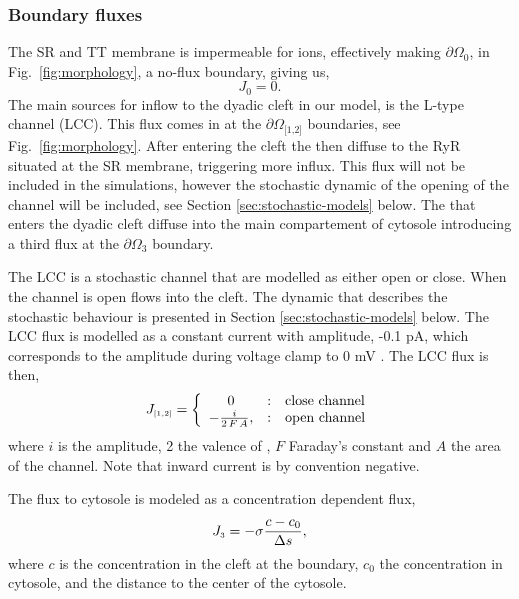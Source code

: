 \subsubsection{Boundary fluxes}
The SR and TT membrane is impermeable for ions, effectively making $\partial\Omega_{\scriptscriptstyle\text{0}}$, in Fig.~\ref{fig:morphology}, a no-flux boundary, giving us,
\begin{equation}
  \label{eq:no-flux}
  J_{\scriptscriptstyle 0}= 0.
\end{equation}
The main sources for \Ca inflow to the dyadic cleft in our model, is the L-type \Ca channel (LCC). This flux comes in at the $\partial\Omega_{\scriptscriptstyle\text{[1,2]}}$ boundaries, see Fig.~\ref{fig:morphology}. After entering the cleft the \Ca then diffuse to the RyR situated at the SR membrane, triggering more \Ca influx. This flux will not be included in the simulations, however the stochastic dynamic of the opening of the channel will be included, see Section \ref{sec:stochastic-models} below. The \Ca that enters the dyadic cleft diffuse into the main compartement of cytosole introducing a third flux at the $\partial\Omega_{\scriptscriptstyle\text{3}}$ boundary.\par

The LCC is a stochastic channel that are modelled as either open or close. When the channel is open \Ca flows into the cleft. The dynamic that describes the stochastic behaviour is presented in Section \ref{sec:stochastic-models} below. The LCC flux is modelled as a constant current with amplitude, -0.1 pA, which corresponds to the amplitude during voltage clamp to 0 mV \cite{Guia_2001_2742}. The LCC flux is then,
\begin{equation}
\label{eq:constant-current-flux}
J_{\scriptscriptstyle[1,2]}= \left\{
  \begin{array}{c@{\quad:\quad}l}
    0& \text{close channel}\\
    - \frac{i}{2\,F\,A},& \text{open channel}
  \end{array}
\right.
\end{equation}
\noindent where $i$ is the amplitude, 2 the valence of \Ca, $F$ Faraday's constant and $A$ the area of the channel. Note that inward current is by convention negative.\par
The flux to cytosole is modeled as a concentration dependent flux,
\begin{equation}
  \label{eq:conc-dependent-flux}
  J_{\scriptscriptstyle 3}= -\sigma\frac{c - c_0}{\Delta{}s},
\end{equation}
where $c$ is the concentration in the cleft at the boundary, $c_0$ the concentration in cytosole, and \Ds the distance to the center of the cytosole.\par

